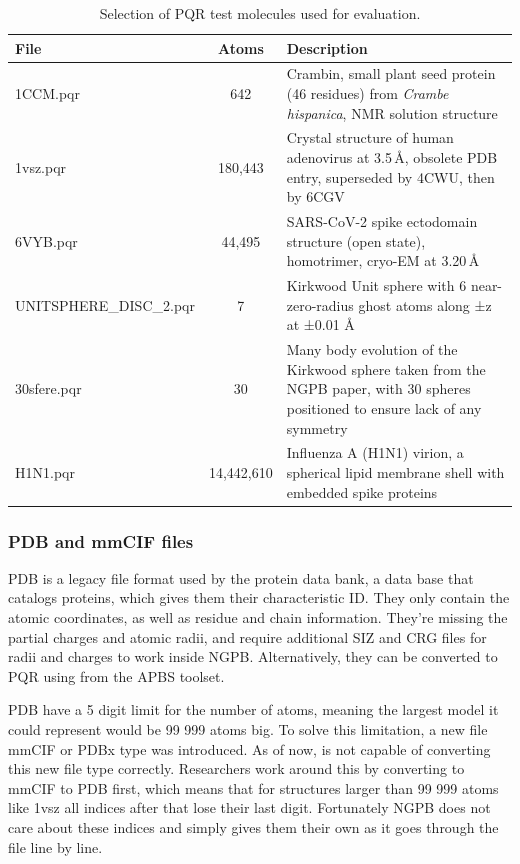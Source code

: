 \begin{table}[htbp]
    \centering
    \begin{tabular}{lcp{8cm}}
        \toprule
        File & Atoms & Description \\
        \midrule
        1CCM.pqr & 642 & Crambin, small plant seed protein (46 residues) from \textit{Crambe hispanica}, NMR solution structure \\
        1vsz.pqr & 180{,}443 & Crystal structure of human adenovirus at 3.5\,\AA{}, obsolete PDB entry, superseded by 4CWU, then by 6CGV \\
        6VYB.pqr & 44{,}495 & SARS-CoV-2 spike ectodomain structure (open state), homotrimer, cryo-EM at 3.20\,\AA{} \\
        UNITSPHERE\_DISC\_2.pqr & 7 & Kirkwood Unit sphere with 6 near-zero-radius ghost atoms along ±z at ±0.01 Å \\
        30sfere.pqr & 30 & Many body evolution of the Kirkwood sphere taken from the NGPB paper, with 30 spheres positioned to ensure lack of any symmetry \\
        H1N1.pqr & 14{,}442{,}610 & Influenza A (H1N1) virion, a spherical lipid membrane shell with embedded spike proteins \\
        \bottomrule
    \end{tabular}
    \caption{Selection of PQR test molecules used for evaluation.}
    \label{tab:test-molecules}
\end{table}

\subsubsection{PDB and mmCIF files}

PDB is a legacy file format used by the protein data bank, a data base that catalogs proteins, which gives them their characteristic ID.
They only contain the atomic coordinates, as well as residue and chain information.
They're missing the partial charges and atomic radii, and require additional SIZ and CRG files for radii and charges to work inside NGPB.
Alternatively, they can be converted to PQR using  from the APBS toolset.

PDB have a 5 digit limit for the number of atoms, meaning the largest model it could represent would be 99 999 atoms big.
To solve this limitation, a new file mmCIF or PDBx type was introduced.
As of now,  is not capable of converting this new file type correctly. 
Researchers work around this by converting to mmCIF to PDB first, which means that for structures larger than 99 999 atoms like 1vsz all indices after that lose their last digit.
Fortunately NGPB does not care about these indices and simply gives them their own as it goes through the file line by line.

